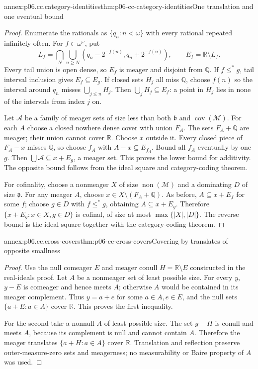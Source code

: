 \begin{annexitem}{annex:p06.cc.category-identities}{thm:p06-cc-category-identities}{One translation and one eventual bound}
\begin{proof}
Enumerate the rationals as \(\{q_n:n<\omega\}\) with every rational
repeated infinitely often. For \(f\in\omega^\omega\), put
\[
 L_f=\bigcap_N\bigcup_{n\geq N}
       (q_n-2^{-f(n)},q_n+2^{-f(n)}),\qquad E_f=\mathbb R\setminus L_f.
\]
Every tail union is open dense, so \(E_f\) is meager and disjoint from
\(\mathbb Q\). If \(f\leq^*g\), tail interval inclusion gives
\(E_f\subseteq E_g\). If closed sets \(H_j\) all miss \(\mathbb Q\),
choose \(f(n)\) so the interval around \(q_n\) misses
\(\bigcup_{j\leq n}H_j\). Then \(\bigcup_jH_j\subseteq E_f\):
a point in \(H_j\) lies in none of the intervals from index \(j\) on.

Let \(\mathcal A\) be a family of meager sets of size less than both
\(\mathfrak b\) and \(\operatorname{cov}(\mathcal M)\).
For each \(A\) choose a closed nowhere dense cover with union \(F_A\).
The sets \(F_A+\mathbb Q\) are meager; their union cannot cover
\(\mathbb R\). Choose \(x\) outside it. Every closed piece of
\(F_A-x\) misses \(\mathbb Q\), so choose \(f_A\) with
\(A-x\subseteq E_{f_A}\). Bound all \(f_A\) eventually by one \(g\).
Then \(\bigcup\mathcal A\subseteq x+E_g\), a meager set. This proves
the lower bound for additivity. The opposite bound follows from the ideal
square and category-coding theorem.

For cofinality, choose a nonmeager \(X\) of size
\(\operatorname{non}(\mathcal M)\) and a dominating
\(D\) of size \(\mathfrak d\). For any meager \(A\), choose
\(x\in X\setminus(F_A+\mathbb Q)\). As before,
\(A\subseteq x+E_f\) for some \(f\); choose \(g\in D\) with
\(f\leq^*g\), obtaining \(A\subseteq x+E_g\). Therefore
\(\{x+E_g:x\in X,g\in D\}\) is cofinal, of size at most
\(\max\{|X|,|D|\}\). The reverse bound is the ideal square together
with the category-coding theorem.
\end{proof}
\end{annexitem}

\begin{annexitem}{annex:p06.cc.cross-covers}{thm:p06-cc-cross-covers}{Covering by translates of opposite smallness}
\begin{proof}
Use the null comeager \(E\) and meager conull \(H=\mathbb R\setminus E\)
constructed in the real-ideals proof. Let \(A\) be a nonmeager set of
least possible size. For every \(y\), \(y-E\) is comeager and hence
meets \(A\); otherwise \(A\) would be contained in its meager
complement. Thus \(y=a+e\) for some \(a\in A,e\in E\), and
the null sets \(\{a+E:a\in A\}\) cover \(\mathbb R\).
This proves the first inequality.

For the second take a nonnull \(A\) of least possible size. The set
\(y-H\) is conull and meets \(A\), because its complement is null
and cannot contain \(A\). Therefore the meager translates
\(\{a+H:a\in A\}\) cover \(\mathbb R\). Translation and reflection
preserve outer-measure-zero sets and meagerness; no measurability or
Baire property of \(A\) was used.
\end{proof}
\end{annexitem}

